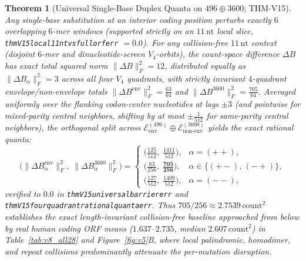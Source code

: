 \documentclass[11pt, a4paper]{article}
\newtheorem{theorem}{Theorem}[section]
\DeclareRobustCommand{\_}{\textunderscore\allowbreak}
\begin{document}
\begin{theorem}[Universal Single-Base Duplex Quanta on $496 \oplus 3600$; THM-V15]
\label{thm:v15}
Any single-base substitution at an interior coding position perturbs exactly $6$ overlapping $6$-mer windows (supported strictly on an $11\,\mathrm{nt}$ local slice, \texttt{thmV15\_local\_11nt\_vs\_full\_orf\_err} $= 0.0$). For any collision-free $11\,\mathrm{nt}$ context (disjoint $6$-mer and dinucleotide-screen $V_4$-orbits), the count-space difference $\Delta B$ has exact total squared norm $\|\Delta B\|_F^2 = 12$, distributed equally as $\|\Delta B_\alpha\|_F^2 = 3$ across all four $V_4$ quadrants, with strictly invariant $4$-quadrant envelope/non-envelope totals $\|\Delta B^{\mathrm{env}}\|_F^2 = \tfrac{63}{64}$ and $\|\Delta B^{3600}\|_F^2 = \tfrac{705}{64}$. Averaged uniformly over the flanking codon-center nucleotides at lags $\pm 3$ (and pointwise for mixed-parity central neighbors, shifting by at most $\pm \tfrac{1}{512}$ for same-parity central neighbors), the orthogonal split across $\mathcal{E}_{\mathrm{env}}^{(496)} \oplus \mathcal{E}_{\mathrm{non\text{-}env}}^{(3600)}$ yields the exact rational quanta:
\begin{equation}
    \bigl(\|\Delta B_\alpha^{\mathrm{env}}\|_F^2,\; \|\Delta B_\alpha^{3600}\|_F^2\bigr) =
    \begin{cases}
        \bigl(\tfrac{125}{512},\; \tfrac{1411}{512}\bigr), & \alpha = (++), \\[3pt]
        \bigl(\tfrac{63}{256},\; \mathbf{\tfrac{705}{256}}\bigr), & \alpha \in \{(+-),\, (-+)\}, \\[3pt]
        \bigl(\tfrac{127}{512},\; \tfrac{1409}{512}\bigr), & \alpha = (--),
    \end{cases}
\end{equation}
verified to $0.0$ in \texttt{thmV15\_universal\_705\_256\_barrier\_err} and \texttt{thmV15\_four\_quadrant\_rational\_quanta\_err}. Thus $705/256 \approx 2.7539\,\mathrm{count}^2$ establishes the exact length-invariant collision-free baseline approached from below by real human coding ORF means ($1.637\text{--}2.735$, median $2.607\,\mathrm{count}^2$) in Table~\ref{tab:v8_all28} and Figure~\ref{fig:v5}B, where local palindromic, homodimer, and repeat collisions predominantly attenuate the per-mutation disruption.
\end{theorem}
\end{document}

